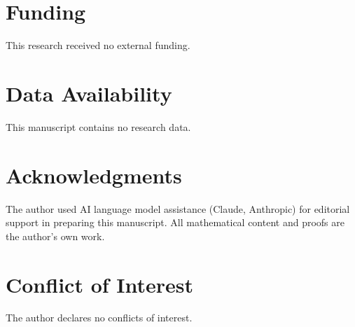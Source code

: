 \documentclass[12pt]{article}
\theoremstyle{remark}
\theoremstyle{plain}
\begin{document}
\section*{Funding}
This research received no external funding.

\section*{Data Availability}
This manuscript contains no research data.

\section*{Acknowledgments}
The author used AI language model assistance (Claude, Anthropic) for
editorial support in preparing this manuscript. All mathematical content
and proofs are the author's own work.

\section*{Conflict of Interest}
The author declares no conflicts of interest.
\end{document}

